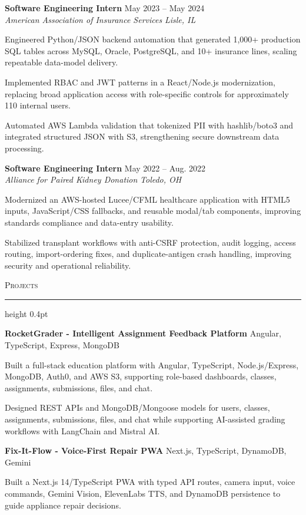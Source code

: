 \documentclass[letterpaper,11pt]{article}
\newcommand{\resumesection}[1]{%
  \par\vspace{2pt}%
  {\large\scshape #1}\par\vspace{2pt}%
  \hrule height 0.4pt\vspace{2pt}%
}
\newcommand{\resumeSubheading}[4]{
  \textbf{#1} \hfill #2\\
  \textit{#3} \hfill \textit{#4}
}
\newcommand{\projectHeading}[2]{
  \textbf{#1} \hfill #2
}
\begin{document}
\resumeSubheading
{Software Engineering Intern}{May 2023 -- May 2024}
{American Association of Insurance Services}{Lisle, IL}
\begin{tightitemize}
  \item Engineered Python/JSON backend automation that generated 1,000+ production SQL tables across MySQL, Oracle, PostgreSQL, and 10+ insurance lines, scaling repeatable data-model delivery.
  \item Implemented RBAC and JWT patterns in a React/Node.js modernization, replacing broad application access with role-specific controls for approximately 110 internal users.
  \item Automated AWS Lambda validation that tokenized PII with hashlib/boto3 and integrated structured JSON with S3, strengthening secure downstream data processing.
\end{tightitemize}

\resumeSubheading
{Software Engineering Intern}{May 2022 -- Aug. 2022}
{Alliance for Paired Kidney Donation}{Toledo, OH}
\begin{tightitemize}
  \item Modernized an AWS-hosted Lucee/CFML healthcare application with HTML5 inputs, JavaScript/CSS fallbacks, and reusable modal/tab components, improving standards compliance and data-entry usability.
  \item Stabilized transplant workflows with anti-CSRF protection, audit logging, access routing, import-ordering fixes, and duplicate-antigen crash handling, improving security and operational reliability.
\end{tightitemize}

\resumesection{Projects}
\projectHeading{RocketGrader - Intelligent Assignment Feedback Platform}{Angular, TypeScript, Express, MongoDB}
\begin{tightitemize}
  \item Built a full-stack education platform with Angular, TypeScript, Node.js/Express, MongoDB, Auth0, and AWS S3, supporting role-based dashboards, classes, assignments, submissions, files, and chat.
  \item Designed REST APIs and MongoDB/Mongoose models for users, classes, assignments, submissions, files, and chat while supporting AI-assisted grading workflows with LangChain and Mistral AI.
\end{tightitemize}

\projectHeading{Fix-It-Flow - Voice-First Repair PWA}{Next.js, TypeScript, DynamoDB, Gemini}
\begin{tightitemize}
  \item Built a Next.js 14/TypeScript PWA with typed API routes, camera input, voice commands, Gemini Vision, ElevenLabs TTS, and DynamoDB persistence to guide appliance repair decisions.
\end{tightitemize}
\end{document}

